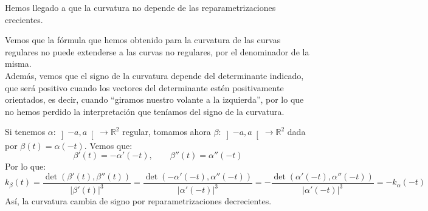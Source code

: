 \noindent
Hemos llegado a que la curvatura no depende de las reparametrizaciones crecientes.\\

\begin{observacion}
    Vemos que la fórmula que hemos obtenido para la curvatura de las curvas regulares no puede extenderse a las curvas no regulares, por el denominador de la misma.\\

    \noindent
    Además, vemos que el signo de la curvatura depende del determinante indicado, que será positivo cuando los vectores del determinante estén positivamente orientados, es decir, cuando ``giramos nuestro volante a la izquierda'', por lo que no hemos perdido la interpretación que teníamos del signo de la curvatura.
\end{observacion}

\begin{ejemplo}
    Si tenemos $\alpha:\left]-a,a\right[\to \mathbb{R}^2$ regular, tomamos ahora $\beta:\left]-a,a\right[\to \mathbb{R}^2$ dada por $\beta(t) = \alpha(-t)$. Vemos que:
    \begin{equation*}
        \beta'(t) = -\alpha'(-t), \qquad \beta''(t) = \alpha''(-t)
    \end{equation*}
    Por lo que:
    \begin{equation*}
        k_\beta(t) = \frac{\det(\beta'(t), \beta''(t))}{|\beta'(t)|^3} = \frac{\det(-\alpha'(-t), \alpha''(-t))}{|\alpha'(-t)|^3} = -\frac{\det(\alpha'(-t), \alpha''(-t))}{|\alpha'(-t)|^3} = -k_\alpha(-t)
    \end{equation*}
    Así, la curvatura cambia de signo por reparametrizaciones decrecientes.
\end{ejemplo}

